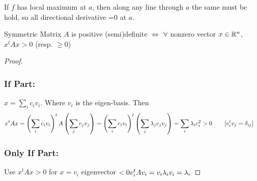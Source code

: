 If $f$ has local maximum  at $a$, then along any line through $a$ the same must be hold, so all directional derivative =0 at $a$.

\begin{Claim}{}{}
	Symmetric Matrix  $A$ is positive (semi)definite $\iff $ $\forall$ nonzero vector $x\in \mathbb{R}^n$, $x^tAx>0$ (resp. $\geq 0$)
\end{Claim}
\begin{proof}
	\subsubsection*{If Part:}
	$x=\sum\limits_{i}c_iv_i$. Where $v_i$ is the eigen-basis. Then \begin{align*}
		x^tAx & = \left(\sum\limits_{i}c_iv_i\right)^tA\left(\sum\limits_{j}c_jv_j\right) = \left(\sum\limits_{i}c_iv_i\right)^t\left( \sum_j\lambda_jc_jv_j \right) = \sum_i\lambda_ic_i^2>0 \qquad [v_i^tv_j=\delta_{ij}]
	\end{align*}
\subsubsection*{Only If Part:}
Use $x^tAx>0$  for $x=v_i$ eigenvector $<0v_i^tAv_i=v_i\lambda_iv_i=\lambda_i$
\end{proof}



